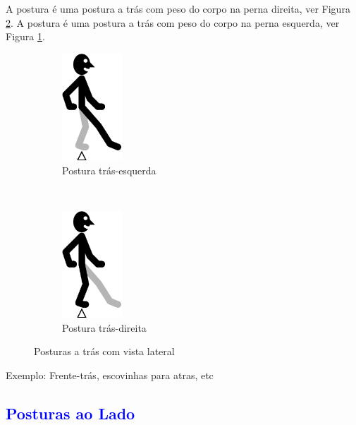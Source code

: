 A postura  é uma postura a trás com peso do corpo na perna direita, ver Figura \ref{fig:trasdireita}.
A postura  é uma postura a trás com peso do corpo na perna esquerda, ver Figura \ref{fig:trasesquerda}.
\begin{figure}[H]
    \centering
    \begin{subfigure}[b]{0.3\textwidth}
        \includegraphics[height=4cm]{chapters/cap-posturas/postura-ft-tras-esq.eps}
        \caption{Postura trás-esquerda}
        \label{fig:trasesquerda}
    \end{subfigure}
    ~ %
    \begin{subfigure}[b]{0.3\textwidth}
        \includegraphics[height=4cm]{chapters/cap-posturas/postura-ft-tras-der.eps}
        \caption{Postura trás-direita}
        \label{fig:trasdireita}
    \end{subfigure}      
    \caption{Posturas a trás  com vista lateral}\label{fig:trasderesq}
\end{figure}

Exemplo: Frente-trás, escovinhas para atras, etc

\subsection{\textcolor{blue}{ Posturas ao Lado}}

